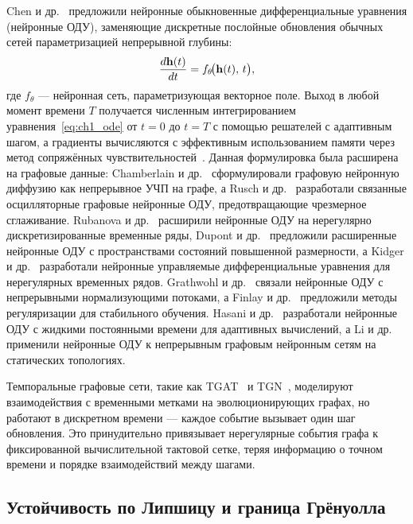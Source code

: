 Chen и др.~\cite{Chen2018} предложили нейронные обыкновенные дифференциальные уравнения (нейронные ОДУ), заменяющие дискретные послойные обновления обычных сетей параметризацией непрерывной глубины:
\begin{equation}
\frac{d\mathbf{h}(t)}{dt} = f_\theta\!\bigl(\mathbf{h}(t),\, t\bigr),
\label{eq:ch1_ode}
\end{equation}
где $f_\theta$ --- нейронная сеть, параметризующая векторное поле. Выход в любой момент времени $T$ получается численным интегрированием уравнения~\eqref{eq:ch1_ode} от $t=0$ до $t=T$ с помощью решателей с адаптивным шагом, а градиенты вычисляются с эффективным использованием памяти через метод сопряжённых чувствительностей~\cite{Pontryagin1962}. Данная формулировка была расширена на графовые данные: Chamberlain и др.~\cite{Chamberlain2021} сформулировали графовую нейронную диффузию как непрерывное УЧП на графе, а Rusch и др.~\cite{Rusch2022} разработали связанные осцилляторные графовые нейронные ОДУ, предотвращающие чрезмерное сглаживание. Rubanova и др.~\cite{Rubanova2019} расширили нейронные ОДУ на нерегулярно дискретизированные временные ряды, Dupont и др.~\cite{Dupont2019} предложили расширенные нейронные ОДУ с пространствами состояний повышенной размерности, а Kidger и др.~\cite{Kidger2020} разработали нейронные управляемые дифференциальные уравнения для нерегулярных временных рядов. Grathwohl и др.~\cite{Grathwohl2019} связали нейронные ОДУ с непрерывными нормализующими потоками, а Finlay и др.~\cite{Finlay2020} предложили методы регуляризации для стабильного обучения. Hasani и др.~\cite{Hasani2021} разработали нейронные ОДУ с жидкими постоянными времени для адаптивных вычислений, а Li и др.~\cite{Li2020ode} применили нейронные ОДУ к непрерывным графовым нейронным сетям на статических топологиях.

Темпоральные графовые сети, такие как TGAT~\cite{Xu2020tgat} и TGN~\cite{Rossi2020}, моделируют взаимодействия с временными метками на эволюционирующих графах, но работают в дискретном времени --- каждое событие вызывает один шаг обновления. Это принудительно привязывает нерегулярные события графа к фиксированной вычислительной тактовой сетке, теряя информацию о точном времени и порядке взаимодействий между шагами.


\subsection{Устойчивость по Липшицу и граница Грёнуолла}


